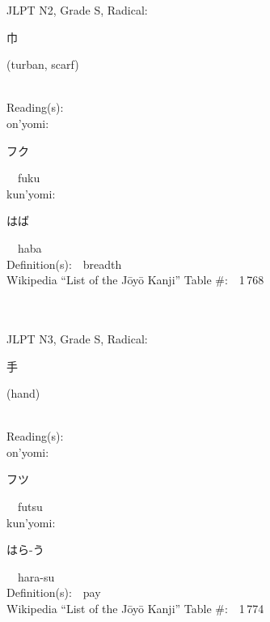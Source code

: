 \begin{multicols}{2}
{JLPT N2, Grade S, Radical:\ \ {\begin{CJK}{UTF8}{min} 巾 \end{CJK}} (turban, scarf) } \\
Reading(s):\ \ \\
{\hspace*{1em}}on'yomi:\ \ \\
{\hspace*{2em}}{\begin{CJK}{UTF8}{min} フク \end{CJK}}\ \ fuku\ \ \\
{\hspace*{1em}}kun'yomi:\ \ \\
{\hspace*{2em}}{\begin{CJK}{UTF8}{min} はば \end{CJK}}\ \ haba\ \ \\
Definition(s):\ \ breadth \\
Wikipedia ``List of the J\=oy\=o Kanji'' Table \#:\ \ 1\,768 \\
\ \ \\
{\fontsize{34pt}{40pt}  }\ \ \\  %
{JLPT N3, Grade S, Radical:\ \ {\begin{CJK}{UTF8}{min} 手 \end{CJK}} (hand) } \\
Reading(s):\ \ \\
{\hspace*{1em}}on'yomi:\ \ \\
{\hspace*{2em}}{\begin{CJK}{UTF8}{min} フツ \end{CJK}}\ \ futsu\ \ \\
{\hspace*{1em}}kun'yomi:\ \ \\
{\hspace*{2em}}{\begin{CJK}{UTF8}{min} はら-う \end{CJK}}\ \ hara-su\ \ \\
Definition(s):\ \ pay \\
Wikipedia ``List of the J\=oy\=o Kanji'' Table \#:\ \ 1\,774 \\
\ \ \\

\end{multicols}
